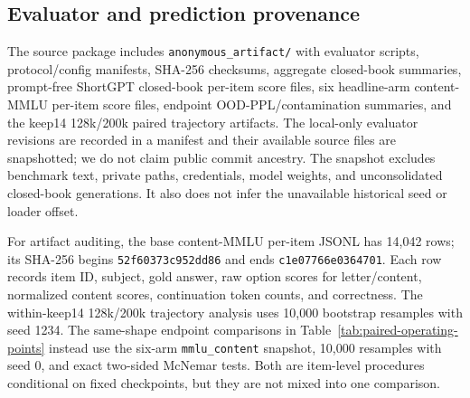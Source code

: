 \subsection{Evaluator and prediction provenance}
The source package includes \texttt{anonymous\_artifact/} with evaluator
scripts, protocol/config manifests, SHA-256 checksums, aggregate closed-book
summaries, prompt-free ShortGPT closed-book per-item score files, six
headline-arm content-MMLU per-item score files, endpoint OOD-PPL/contamination
summaries, and the keep14 128k/200k paired trajectory artifacts. The local-only
evaluator revisions are
recorded in a manifest and their available source files are snapshotted; we do
not claim public commit ancestry. The snapshot excludes benchmark text, private
paths, credentials, model weights, and unconsolidated closed-book generations.
It also does not infer the unavailable historical seed or loader offset.

For artifact auditing, the base content-MMLU per-item JSONL has 14,042 rows;
its SHA-256 begins \texttt{52f60373c952dd86} and ends
\texttt{c1e07766e0364701}. Each row records
item ID, subject, gold answer, raw option scores for letter/content, normalized
content scores, continuation token counts, and correctness. The within-keep14
128k/200k trajectory analysis uses 10,000 bootstrap resamples with seed 1234.
The same-shape endpoint comparisons in
Table~\ref{tab:paired-operating-points} instead use the six-arm
\texttt{mmlu\_content} snapshot, 10,000 resamples with seed 0, and exact
two-sided McNemar tests. Both are item-level procedures conditional on fixed
checkpoints, but they are not mixed into one comparison.


